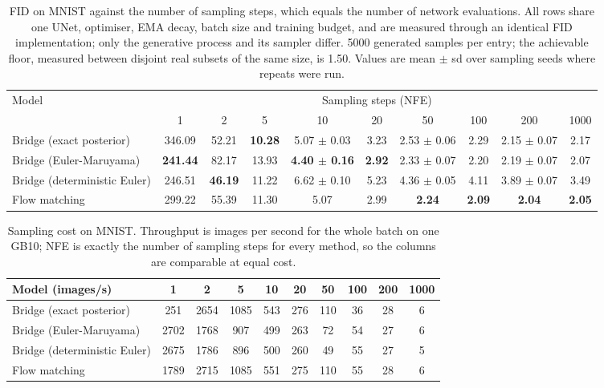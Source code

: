 \begin{table}[t]
\caption{FID on MNIST against the number of sampling steps, which equals the number of network evaluations. All rows share one UNet, optimiser, EMA decay, batch size and training budget, and are measured through an identical FID implementation; only the generative process and its sampler differ. 5000 generated samples per entry; the achievable floor, measured between disjoint real subsets of the same size, is 1.50. Values are mean $\pm$ sd over sampling seeds where repeats were run.}
\label{tab:fid-mnist}
\centering
\small
\begin{tabular}{lccccccccc}
\toprule
Model & \multicolumn{9}{c}{Sampling steps (NFE)} \\
\cmidrule(lr){2-10}
 & 1 & 2 & 5 & 10 & 20 & 50 & 100 & 200 & 1000 \\
\midrule
Bridge (exact posterior) & 346.09 & 52.21 & \textbf{10.28} & 5.07 $\pm$ 0.03 & 3.23 & 2.53 $\pm$ 0.06 & 2.29 & 2.15 $\pm$ 0.07 & 2.17 \\
Bridge (Euler-Maruyama) & \textbf{241.44} & 82.17 & 13.93 & \textbf{4.40 $\pm$ 0.16} & \textbf{2.92} & 2.33 $\pm$ 0.07 & 2.20 & 2.19 $\pm$ 0.07 & 2.07 \\
Bridge (deterministic Euler) & 246.51 & \textbf{46.19} & 11.22 & 6.62 $\pm$ 0.10 & 5.23 & 4.36 $\pm$ 0.05 & 4.11 & 3.89 $\pm$ 0.07 & 3.49 \\
Flow matching & 299.22 & 55.39 & 11.30 & 5.07 & 2.99 & \textbf{2.24} & \textbf{2.09} & \textbf{2.04} & \textbf{2.05} \\
\bottomrule
\end{tabular}
\end{table}

\begin{table}[t]
\caption{Sampling cost on MNIST. Throughput is images per second for the whole batch on one GB10; NFE is exactly the number of sampling steps for every method, so the columns are comparable at equal cost.}
\centering
\small
\begin{tabular}{lccccccccc}
\toprule
Model (images/s) & 1 & 2 & 5 & 10 & 20 & 50 & 100 & 200 & 1000 \\
\midrule
Bridge (exact posterior) & 251 & 2654 & 1085 & 543 & 276 & 110 & 36 & 28 & 6 \\
Bridge (Euler-Maruyama) & 2702 & 1768 & 907 & 499 & 263 & 72 & 54 & 27 & 6 \\
Bridge (deterministic Euler) & 2675 & 1786 & 896 & 500 & 260 & 49 & 55 & 27 & 5 \\
Flow matching & 1789 & 2715 & 1085 & 551 & 275 & 110 & 55 & 28 & 6 \\
\bottomrule
\end{tabular}
\end{table}
